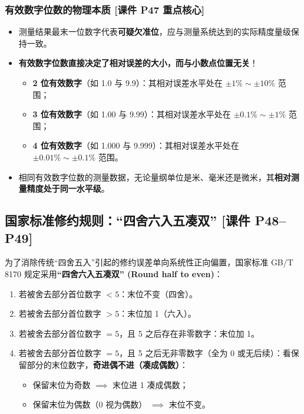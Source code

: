 \documentclass[11pt,a4paper]{ctexart}
\begin{document}
\subsubsection{有效数字位数的物理本质 [课件 P47 重点核心]}
\begin{itemize}
    \item 测量结果最末一位数字代表\textbf{可疑欠准位}，应与测量系统达到的实际精度量级保持一致。
    \item \textbf{有效数字位数直接决定了相对误差的大小，而与小数点位置无关}！
    \begin{itemize}
        \item \textbf{2 位有效数字}（如 1.0 与 9.9）：其相对误差水平处在 $\pm 1\% \sim \pm 10\%$ 范围；
        \item \textbf{3 位有效数字}（如 1.00 与 9.99）：其相对误差水平处在 $\pm 0.1\% \sim \pm 1\%$ 范围；
        \item \textbf{4 位有效数字}（如 1.000 与 9.999）：其相对误差水平处在 $\pm 0.01\% \sim \pm 0.1\%$ 范围。
    \end{itemize}
    \item 相同有效数字位数的测量数据，无论量纲单位是米、毫米还是微米，其\textbf{相对测量精度处于同一水平级}。
\end{itemize}

\subsection{国家标准修约规则：“四舍六入五凑双” \textnormal{[课件 P48--P49]}}

为了消除传统“四舍五入”引起的修约误差单向系统性正向偏置，国家标准 GB/T 8170 规定采用\textbf{“四舍六入五凑双” (Round half to even)}：
\begin{enumerate}
    \item 若被舍去部分首位数字 $< 5$：末位不变（四舍）。
    \item 若被舍去部分首位数字 $> 5$：末位加 1（六入）。
    \item 若被舍去部分首位数字 $= 5$，且 5 之后存在非零数字：末位加 1。
    \item 若被舍去部分首位数字 $= 5$，且 5 之后无非零数字（全为 0 或无后续）：看保留部分的末位数字，\textbf{奇进偶不进（凑成偶数）}：
    \begin{itemize}
        \item 保留末位为奇数 $\implies$ 末位进 1 凑成偶数；
        \item 保留末位为偶数（0 视为偶数） $\implies$ 末位不变。
    \end{itemize}
\end{enumerate}
\end{document}
